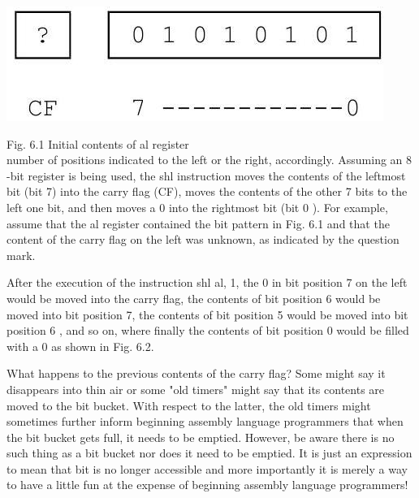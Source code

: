 \documentclass[10pt]{article}
\begin{document}
\begin{center}
\includegraphics[max width=\textwidth]{2025_03_24_ebe50cc223a6fbc49eecg-116}
\end{center}

Fig. 6.1 Initial contents of al register\\
number of positions indicated to the left or the right, accordingly. Assuming an 8 -bit register is being used, the shl instruction moves the contents of the leftmost bit (bit 7) into the carry flag (CF), moves the contents of the other 7 bits to the left one bit, and then moves a 0 into the rightmost bit (bit 0 ). For example, assume that the al register contained the bit pattern in Fig. 6.1 and that the content of the carry flag on the left was unknown, as indicated by the question mark.

After the execution of the instruction shl al, 1, the 0 in bit position 7 on the left would be moved into the carry flag, the contents of bit position 6 would be moved into bit position 7, the contents of bit position 5 would be moved into bit position 6 , and so on, where finally the contents of bit position 0 would be filled with a 0 as shown in Fig. 6.2.

What happens to the previous contents of the carry flag? Some might say it disappears into thin air or some "old timers" might say that its contents are moved to the bit bucket. With respect to the latter, the old timers might sometimes further inform beginning assembly language programmers that when the bit bucket gets full, it needs to be emptied. However, be aware there is no such thing as a bit bucket nor does it need to be emptied. It is just an expression to mean that bit is no longer accessible and more importantly it is merely a way to have a little fun at the expense of beginning assembly language programmers!
\end{document}
